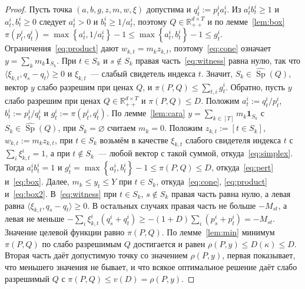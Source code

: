 \documentclass[a4paper,11pt]{article}
\theoremstyle{plain}
\theoremstyle{definition}
\theoremstyle{remark}
\newcommand{\R}{\mathbb{R}}
\newcommand{\set}[1]{\left\{ #1 \right\}}
\newcommand{\ip}[2]{\langle #1, #2\rangle} %
\newcommand{\Rpp}[1][2]{\R^{#1}_{++}} %
\DeclareMathOperator{\Sp}{Sp}
\begin{document}
\begin{proof}
    Пусть точка $(a,b,g,z,m,w,\xi)$ допустима и $q^i_t:=p^i_ta^i_t$. Из $a^i_tb^i_t\ge1$ и $a^i_t,b^i_t\ge0$ следует $a^i_t>0$ и $b^i_t\ge1/a^i_t$, поэтому $Q\in\Rpp[d\times T]$ и по лемме~\ref{lem:box} $\pi(p^i_t,q^i_t)=\max\set{a^i_t,1/a^i_t}-1\le\max\set{a^i_t,b^i_t}-1\le g^i_t$. Ограничения~\eqref{eq:product} дают $w_{k,t}=m_kz_{k,t}$, поэтому~\eqref{eq:cone} означает $y=\sum_km_k\mathbf 1_{S_k}$. При $t\in S_k$ и $s\notin S_k$ правая часть~\eqref{eq:witness} равна нулю, так что $\ip{\xi_{k,t}}{q_s-q_t}\ge0$ и $\xi_{k,t}$~--- слабый свидетель индекса $t$. Значит, $S_k\in\widehat{\Sp}(Q)$, вектор $y$ слабо разрешим при ценах $Q$, и $\pi(P,Q)\le\sum_{t,i}g^i_t$.
    Обратно, пусть $y$ слабо разрешим при ценах $Q\in\Rpp[d\times T]$ и $\pi(P,Q)\le D$. Положим $a^i_t:=q^i_t/p^i_t$, $b^i_t:=p^i_t/q^i_t$ и $g^i_t:=\pi(p^i_t,q^i_t)$. По лемме~\ref{lem:cara} $y=\sum_{k\in[T]}m_k\mathbf 1_{S_k}$ с $S_k\in\widehat{\Sp}(Q)$, при $S_k=\varnothing$ считаем $m_k=0$. Положим $z_{k,t}:=[t\in S_k]$, $w_{k,t}:=m_kz_{k,t}$, при $t\in S_k$ возьмём в качестве $\xi_{k,t}$ слабого свидетеля индекса $t$ с $\sum_i\xi^i_{k,t}=1$, а при $t\notin S_k$~--- любой вектор с такой суммой, откуда~\eqref{eq:simplex}. Тогда $a^i_tb^i_t=1$ и $g^i_t=\max\set{a^i_t,b^i_t}-1\le\pi(P,Q)\le D$, откуда~\eqref{eq:pert} и~\eqref{eq:box}. Далее, $m_k\le y_t\le Y$ при $t\in S_k$, откуда~\eqref{eq:cone}, \eqref{eq:product} и~\eqref{eq:box2}. В~\eqref{eq:witness} при $t\in S_k$, $s\notin S_k$ правая часть равна нулю, а левая равна $\ip{\xi_{k,t}}{q_s-q_t}\ge0$. В остальных случаях правая часть не больше $-M_{st}$, а левая не меньше $-\sum_i\xi^i_{k,t}(q^i_s+q^i_t)\ge-(1+D)\sum_i(p^i_s+p^i_t)=-M_{st}$. Значение целевой функции равно $\pi(P,Q)$.
    По лемме~\ref{lem:min} минимум $\pi(P,Q)$ по слабо разрешимым $Q$ достигается и равен $\rho(P,y)\le D(\kappa)\le D$. Вторая часть даёт допустимую точку со значением $\rho(P,y)$, первая показывает, что меньшего значения не бывает, и что всякое оптимальное решение даёт слабо разрешимый $Q$ с $\pi(P,Q)\le v(D)=\rho(P,y)$.
\end{proof}
\end{document}
